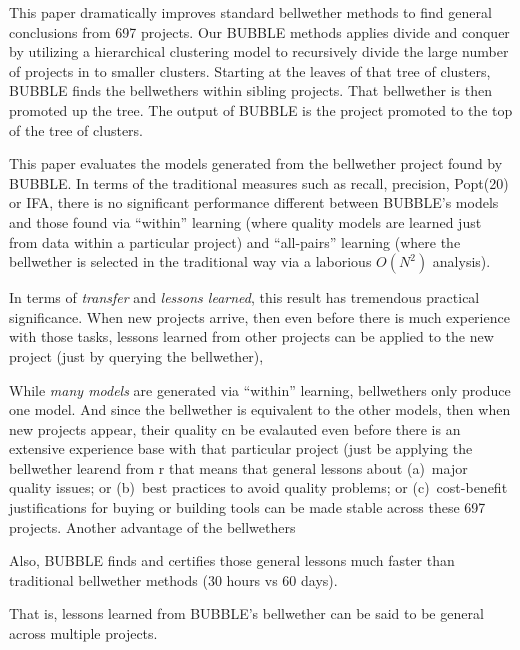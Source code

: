 \documentclass[10pt,journal,compsoc]{IEEEtran}
\begin{document}
This paper dramatically improves standard bellwether methods to find general conclusions from 697 projects.
 Our BUBBLE  methods applies divide and conquer  by utilizing a hierarchical clustering model to recursively divide the large number of projects in to smaller clusters. Starting at the leaves of that tree of clusters, BUBBLE finds the    bellwethers within sibling projects. That bellwether is then promoted up the tree. The output of BUBBLE is the project promoted to the top of the tree of clusters. 
 
 This paper evaluates the models generated from the bellwether project found by BUBBLE. In terms of the traditional measures such as recall, precision, Popt(20) or IFA, there is no significant performance different between BUBBLE's models and those found  via ``within'' learning (where quality models are learned just from data within a particular project) and ``all-pairs'' learning (where the bellwether is selected in the traditional way via a laborious $O(N^2)$ analysis). 
 
In terms of {\em transfer} and {\em lessons learned},  this result has tremendous practical significance.  When new projects arrive, then even before there is much experience with those tasks,  lessons learned from other projects can be applied to the new project (just by querying the bellwether),

While {\em many models} are generated via ``within'' learning, bellwethers only produce one model. And since the bellwether is equivalent to the other models,
 then when new projects appear, their quality cn be evalauted even before there is an extensive experience base with that particular project (just be applying the bellwether learend from r
 that means that general lessons about (a)~major quality issues;
 or (b)~best practices to avoid quality problems;
 or (c)~cost-benefit justifications for buying or building tools can be made stable across these 697 projects. Another advantage of the bellwethers 
 
 Also, BUBBLE finds and certifies those general lessons much faster than traditional bellwether methods (30 hours vs 60 days). 
 
 That is, lessons learned from BUBBLE's bellwether can be said to be general across multiple projects.
 
\end{document}
